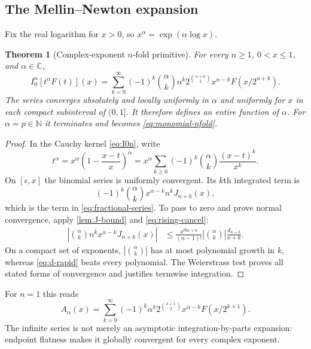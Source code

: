 \documentclass[11pt,oneside]{article}
\numberwithin{equation}{section}
\newtheorem{theorem}{Theorem}[section]
\theoremstyle{definition}
\theoremstyle{remark}
\newcommand{\C}{\mathbb C}
\newcommand{\N}{\mathbb N}
\newcommand{\fall}[2]{#1^{\underline{#2}}}
\newcommand{\rise}[2]{#1^{\overline{#2}}}
\begin{document}
\subsection{The Mellin--Newton expansion}

Fix the real logarithm for $x>0$, so $x^\alpha=\exp(\alpha\log x)$.

\begin{theorem}[Complex-exponent $n$-fold primitive]
\label{thm:fractional-series}
For every $n\ge1$, $0<x\le1$, and $\alpha\in\C$,
\begin{equation}
 \boxed{
 I_0^n[t^\alpha F(t)](x)
 =\sum_{k=0}^{\infty}(-1)^k\binom\alpha k\rise nk
 2^{\binom{n+k}{2}}x^{\alpha-k}F(x/2^{n+k}).}
 \label{eq:fractional-series}
\end{equation}
The series converges absolutely and locally uniformly in $\alpha$ and uniformly for $x$ in
each compact subinterval of $(0,1]$.  It therefore defines an entire function of $\alpha$.
For $\alpha=p\in\N$ it terminates and becomes \eqref{eq:monomial-nfold}.
\end{theorem}

\begin{proof}
In the Cauchy kernel \eqref{eq:I0n}, write
\[
 t^\alpha=x^\alpha\left(1-\frac{x-t}{x}\right)^\alpha
 =x^\alpha\sum_{k\ge0}(-1)^k\binom\alpha k\frac{(x-t)^k}{x^k}.
\]
On $[\epsilon,x]$ the binomial series is uniformly convergent.  Its $k$th integrated term is
\[
 (-1)^k\binom\alpha kx^{\alpha-k}\rise nk J_{n+k}(x),
\]
which is the term in \eqref{eq:fractional-series}.  To pass to zero and prove normal
convergence, apply \cref{lem:J-bound} and \eqref{eq:rising-cancel}:
\begin{align}
 \left|\binom\alpha k\rise nkx^{\alpha-k}J_{n+k}(x)\right|
 &\le
 \frac{x^{\Re\alpha+n}}{(n-1)!}
 \left|\binom\alpha k\right|\frac{d_{n+k}}{n+k}.              \label{eq:normal-bound}
\end{align}
On a compact set of exponents, $|\binom\alpha k|$ has at most polynomial growth in $k$,
whereas \eqref{eq:d-rapid} beats every polynomial.  The Weierstrass test proves all stated
forms of convergence and justifies termwise integration.
\end{proof}

For $n=1$ this reads
\begin{equation}
 \boxed{
 A_\alpha(x)=
 \sum_{k=0}^{\infty}(-1)^k\fall\alpha k
 2^{\binom{k+1}{2}}x^{\alpha-k}F(x/2^{k+1}).}
 \label{eq:A-series}
\end{equation}
The infinite series is not merely an asymptotic integration-by-parts expansion: endpoint
flatness makes it globally convergent for every complex exponent.
\end{document}
